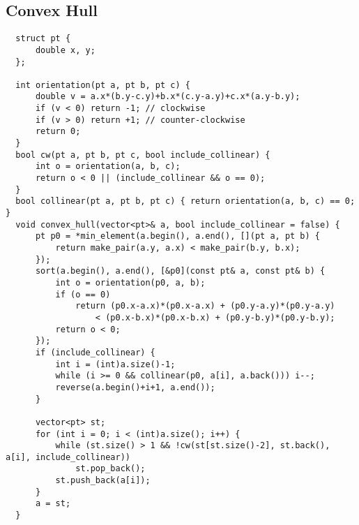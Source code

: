 \subsection{Convex Hull}
\begin{lstlisting}
  struct pt {
      double x, y;
  };

  int orientation(pt a, pt b, pt c) {
      double v = a.x*(b.y-c.y)+b.x*(c.y-a.y)+c.x*(a.y-b.y);
      if (v < 0) return -1; // clockwise
      if (v > 0) return +1; // counter-clockwise
      return 0;
  }
  bool cw(pt a, pt b, pt c, bool include_collinear) {
      int o = orientation(a, b, c);
      return o < 0 || (include_collinear && o == 0);
  }
  bool collinear(pt a, pt b, pt c) { return orientation(a, b, c) == 0; }
  void convex_hull(vector<pt>& a, bool include_collinear = false) {
      pt p0 = *min_element(a.begin(), a.end(), [](pt a, pt b) {
          return make_pair(a.y, a.x) < make_pair(b.y, b.x);
      });
      sort(a.begin(), a.end(), [&p0](const pt& a, const pt& b) {
          int o = orientation(p0, a, b);
          if (o == 0)
              return (p0.x-a.x)*(p0.x-a.x) + (p0.y-a.y)*(p0.y-a.y)
                  < (p0.x-b.x)*(p0.x-b.x) + (p0.y-b.y)*(p0.y-b.y);
          return o < 0;
      });
      if (include_collinear) {
          int i = (int)a.size()-1;
          while (i >= 0 && collinear(p0, a[i], a.back())) i--;
          reverse(a.begin()+i+1, a.end());
      }

      vector<pt> st;
      for (int i = 0; i < (int)a.size(); i++) {
          while (st.size() > 1 && !cw(st[st.size()-2], st.back(), a[i], include_collinear))
              st.pop_back();
          st.push_back(a[i]);
      }
      a = st;
  }
\end{lstlisting}

